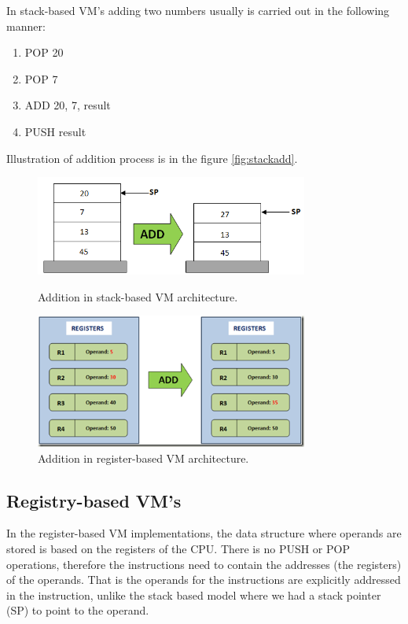 \documentclass[11pt, oneside]{article}   	%
\begin{document}
In stack-based VM's adding two numbers usually is carried out in the following manner:
\begin{enumerate}
  \itemsep0pt
  \item POP 20
  \item POP 7
  \item ADD 20, 7, result
  \item PUSH result
\end{enumerate}
Illustration of addition process is in the figure \ref{fig:stackadd}.

\begin{figure}[h]
\centering
\begin{minipage}{.47\textwidth}
\includegraphics[width=0.8\textwidth]{./images/stackadd.png}
  \caption{Addition in stack-based VM architecture.}
  \label{fig:stackadd}
\end{minipage}
\begin{minipage}{.5\textwidth}
  \includegraphics[width=0.8\textwidth]{./images/registeradd.png}
  \caption{Addition in register-based VM architecture.}
  \label{fig:registeradd}
\end{minipage}
\end{figure}


\subsection{Registry-based VM's}

In the register-based VM implementations, the data structure where operands are stored is based on the registers of the CPU. There is no PUSH or POP operations, therefore the instructions need to contain the addresses (the registers) of the operands. That is the operands for the instructions are explicitly addressed in the instruction, unlike the stack based model where we had a stack pointer (SP) to point to the operand. 
\end{document}
